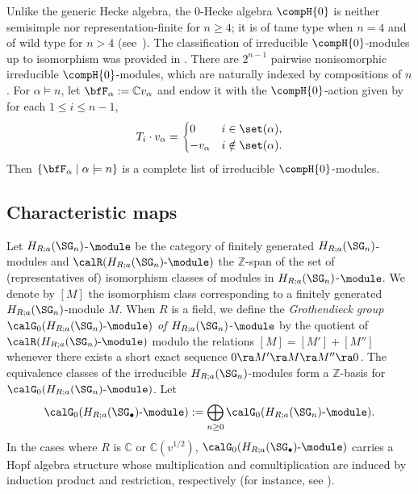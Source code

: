 \documentclass[12pt, reqno]{amsart}
\theoremstyle{plain}
\theoremstyle{definition}
\numberwithin{equation}{section}
\numberwithin{figure}{section}
\numberwithin{table}{section}
\def\Z{\mathbb Z}
\def\C{\mathbb C}
\begin{document}
Unlike the generic Hecke algebra,
the $0$-Hecke algebra $\compH{0}$ is neither semisimple nor representation-finite for $n \ge 4$; it is of tame type when $n = 4$ and of wild type for $n > 4$ (see~\cite{11DY, 02DHT}). 
The classification of irreducible   $\compH{0}$-modules up to isomorphism was provided in  \cite{79Norton}.
There are  $2^{n-1}$ pairwise nonisomorphic irreducible $\compH{0}$-modules, which are naturally indexed by compositions of $n$.
For $\alpha \models n$, let $\bfF_{\alpha}:=\C v_{\alpha}$
and endow it with the $\compH{0}$-action given by
for each $1 \le i \le n-1$,
\begin{align}\label{eq: simple module 0-Hecke action}
T_i \cdot v_\alpha = \begin{cases}
0 & i \in \set(\alpha),\\
-v_\alpha & i \notin \set(\alpha).
\end{cases}
\end{align}
Then $\{\bfF_\alpha \mid \alpha \models n \}$ is a complete list of irreducible $\compH{0}$-modules.







\subsection{Characteristic maps}

Let $H_{R;a}(\SG_n)$-$\module$ be the category of finitely generated  $H_{R;a}(\SG_n)$-modules and $\calR(H_{R;a}(\SG_n)\text{-}\module)$ the $\Z$-span of the set of (representatives of) isomorphism classes of modules in $H_{R;a}(\SG_n)$-$\module$.
We denote by $[M]$ the isomorphism class corresponding to a finitely generated $H_{R;a}(\SG_n)$-module $M$. 
When $R$ is a field,  
we define the \emph{Grothendieck group $\calG_0(H_{R;a}(\SG_n)\text{-}\module)$ of $H_{R;a}(\SG_n)$-$\module$} by the quotient of $\calR(H_{R;a}(\SG_n)\text{-}\module)$ modulo the relations $[M] = [M'] + [M'']$ whenever there exists a short exact sequence $0 \ra M' \ra M \ra M'' \ra 0$. 
The equivalence classes of the irreducible $H_{R;a}(\SG_n)$-modules form a $\Z$-basis for $\calG_0(H_{R;a}(\SG_n)\text{-}\module)$.
Let
\[
\calG_0(H_{R;a}(\SG_\bullet)\text{-}\module) := \bigoplus_{n \ge 0} \calG_0(H_{R;a}(\SG_n)\text{-}\module).
\]
In the cases where $R$ is $\C$ or $\C(v^{1/2})$,
$\calG_0(H_{R;a}(\SG_\bullet)\text{-}\module)$ carries a Hopf algebra structure whose multiplication and comultiplication are induced by induction product and restriction, respectively (for instance, see \cite[Corollary 4.6 and Remark 4.7]{15SY}).
\end{document}
